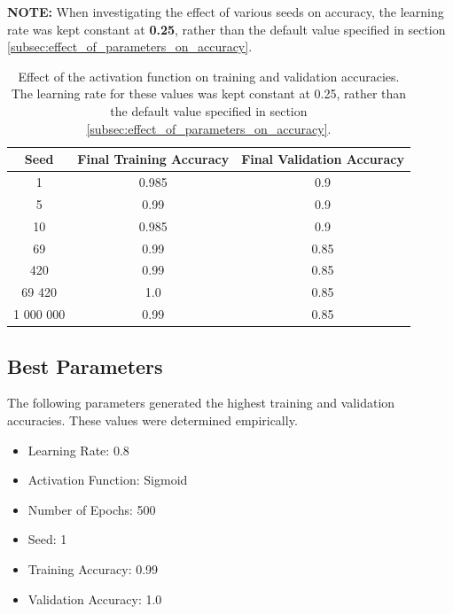 \documentclass{article}
\begin{document}
\begin{enumerate}
        \textbf{NOTE:} When investigating the effect of various seeds on accuracy, the learning
        rate was kept constant at \textbf{0.25}, rather than the default value specified in
        section \ref{subsec:effect_of_parameters_on_accuracy}.
        \begin{table}[ht]
          \label{tab:seed}
          \begin{center}
            \caption{Effect of the activation function on training and validation accuracies.
              The learning rate for these values was kept constant at 0.25, rather than the
              default value specified in section \ref{subsec:effect_of_parameters_on_accuracy}.}
            \begin{tabular}{|c|c|c|}
              \hline
              Seed      & Final Training Accuracy & Final Validation Accuracy \\ \hline
              1         & 0.985                   & 0.9                       \\ \hline
              5         & 0.99                    & 0.9                       \\ \hline
              10        & 0.985                   & 0.9                       \\ \hline
              69        & 0.99                    & 0.85                      \\ \hline
              420       & 0.99                    & 0.85                      \\ \hline
              69 420    & 1.0                     & 0.85                      \\ \hline
              1 000 000 & 0.99                    & 0.85                      \\ \hline
            \end{tabular}
          \end{center}
        \end{table}
\end{enumerate}

\subsection{Best Parameters}
The following parameters generated the highest training and validation
accuracies. These values were determined empirically.
\begin{itemize}
  \item Learning Rate: 0.8
  \item Activation Function: Sigmoid
  \item Number of Epochs: 500
  \item Seed: 1
  \item Training Accuracy: 0.99
  \item Validation Accuracy: 1.0
\end{itemize}
\end{document}
